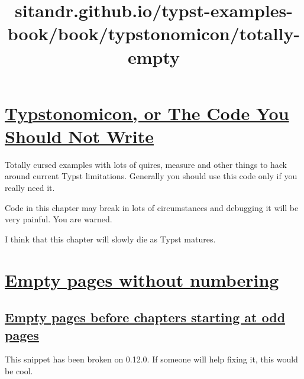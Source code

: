 \section{\texorpdfstring{\hyperref[typstonomicon-or-the-code-you-should-not-write]{Typstonomicon,
or The Code You Should Not
Write}}{Typstonomicon, or The Code You Should Not Write}}\label{typstonomicon-or-the-code-you-should-not-write}

Totally cursed examples with lots of quires, measure and other things to
hack around current Typst limitations. Generally you should use this
code only if you really need it.

Code in this chapter may break in lots of circumstances and debugging it
will be very painful. You are warned.

I think that this chapter will slowly die as Typst matures.


\title{sitandr.github.io/typst-examples-book/book/typstonomicon/totally-empty}

\section{\texorpdfstring{\hyperref[empty-pages-without-numbering]{Empty
pages without
numbering}}{Empty pages without numbering}}\label{empty-pages-without-numbering}

\subsection{\texorpdfstring{\hyperref[empty-pages-before-chapters-starting-at-odd-pages]{Empty
pages before chapters starting at odd
pages}}{Empty pages before chapters starting at odd pages}}\label{empty-pages-before-chapters-starting-at-odd-pages}

This snippet has been broken on 0.12.0. If someone will help fixing it,
this would be cool.

